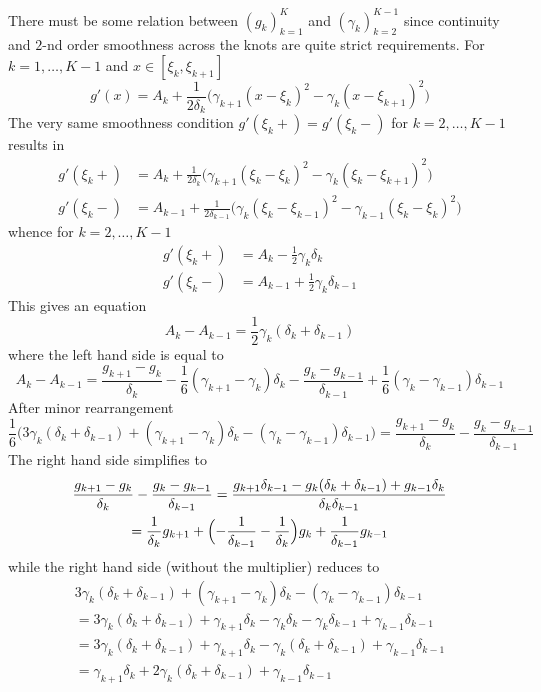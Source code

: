 \documentclass[a4paper]{article}
\begin{document}
There must be some relation between $(g_k)_{k=1}^K$ and $(\gamma_k)_{k=2}^{K-1}$
since continuity and $2$-nd order smoothness across the knots are quite strict
requirements. For $k=1,\ldots,K-1$ and $x\in [\xi_k,\xi_{k+1}]$
\[g'(x) = A_k + \frac{1}{2\delta_k}\bigl(\gamma_{k+1}(x-\xi_k)^2-\gamma_k(x-\xi_{k+1})^2\bigr)\]
The very same smoothness condition $g'(\xi_k+)=g'(\xi_k-)$ for $k=2,\ldots,K-1$ results in
\begin{align*}
	g'(\xi_k+) &= A_k + \frac{1}{2\delta_k}\bigl(\gamma_{k+1}(\xi_k-\xi_k)^2-\gamma_k(\xi_k-\xi_{k+1})^2\bigr)\\
	g'(\xi_k-) &= A_{k-1} + \frac{1}{2\delta_{k-1}}\bigl(\gamma_k(\xi_k-\xi_{k-1})^2-\gamma_{k-1}(\xi_k-\xi_k)^2\bigr)
\end{align*}
whence for $k=2,\ldots,K-1$
\begin{align*}
	g'(\xi_k+) &= A_k - \frac{1}{2}\gamma_k\delta_k\\
	g'(\xi_k-) &= A_{k-1} + \frac{1}{2}\gamma_k\delta_{k-1}
\end{align*}
This gives an equation
\[A_k - A_{k-1} = \frac{1}{2}\gamma_k(\delta_k+\delta_{k-1})\]
where the left hand side is equal to
\[A_k - A_{k-1}
= \frac{g_{k+1} - g_k}{\delta_k} - \frac{1}{6} (\gamma_{k+1}-\gamma_k) \delta_k
- \frac{g_k - g_{k-1}}{\delta_{k-1}} + \frac{1}{6} (\gamma_k-\gamma_{k-1}) \delta_{k-1}
\]
After minor rearrangement
\[
\frac{1}{6}\bigl(3\gamma_k(\delta_k+\delta_{k-1})
+ (\gamma_{k+1}-\gamma_k) \delta_k
- (\gamma_k-\gamma_{k-1}) \delta_{k-1} \bigr)
= \frac{g_{k+1} - g_k}{\delta_k} - \frac{g_k - g_{k-1}}{\delta_{k-1}}
\]
The right hand side simplifies to
\begin{multline*}
\frac{g_{k+1} - g_k}{\delta_k} - \frac{g_k - g_{k-1}}{\delta_{k-1}}
= \frac{g_{k+1}\delta_{k-1} - g_k(\delta_k + \delta_{k-1}) + g_{k-1}\delta_k}{\delta_k\delta_{k-1}}\\
= \frac{1}{\delta_k}g_{k+1} + \Bigl(-\frac{1}{\delta_{k-1}} - \frac{1}{\delta_k}\Bigr)g_k + \frac{1}{\delta_{k-1}}g_{k-1}
\end{multline*}
while the right hand side (without the multiplier) reduces to
\begin{multline*}
	3\gamma_k(\delta_k+\delta_{k-1}) + (\gamma_{k+1}-\gamma_k) \delta_k - (\gamma_k-\gamma_{k-1}) \delta_{k-1}\\
	= 3\gamma_k(\delta_k+\delta_{k-1}) + \gamma_{k+1}\delta_k - \gamma_k\delta_k - \gamma_k\delta_{k-1} + \gamma_{k-1}\delta_{k-1}\\
	= 3\gamma_k(\delta_k+\delta_{k-1}) + \gamma_{k+1}\delta_k - \gamma_k(\delta_k +\delta_{k-1}) + \gamma_{k-1}\delta_{k-1}\\
	= \gamma_{k+1}\delta_k + 2\gamma_k(\delta_k+\delta_{k-1}) + \gamma_{k-1}\delta_{k-1}
\end{multline*}
\end{document}
